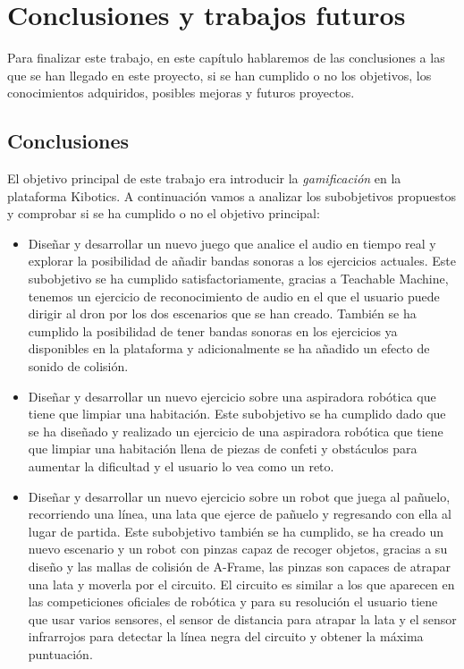 \chapter{Conclusiones y trabajos futuros}\label{conclusion}
Para finalizar este trabajo, en este capítulo hablaremos de las conclusiones a las que se han llegado en este proyecto, si se han cumplido o no los objetivos,  los conocimientos adquiridos, posibles mejoras y futuros proyectos.

\section{Conclusiones}

El objetivo principal de este trabajo era introducir la \textit{gamificación} en la plataforma Kibotics. A continuación vamos a analizar los subobjetivos propuestos y comprobar si se ha cumplido o no el objetivo principal:

\begin{itemize}
    \item Diseñar y desarrollar un nuevo juego que analice el audio en tiempo real y explorar la posibilidad de añadir bandas sonoras a los ejercicios actuales.  Este subobjetivo se ha cumplido satisfactoriamente, gracias a Teachable Machine, tenemos un ejercicio de reconocimiento de audio en el que el usuario puede dirigir al dron por los dos escenarios que se han creado. También se ha cumplido la posibilidad de tener bandas sonoras en los ejercicios ya disponibles en la plataforma y adicionalmente se ha añadido un efecto de sonido de colisión. 

    \item Diseñar y desarrollar un nuevo ejercicio sobre una aspiradora robótica que tiene que limpiar una habitación.  Este subobjetivo se ha cumplido dado que se ha  diseñado y realizado un ejercicio de una aspiradora robótica que tiene que limpiar una habitación llena de piezas de confeti y obstáculos para aumentar la dificultad y el usuario lo vea como un reto.

    \item Diseñar y desarrollar un nuevo ejercicio sobre un robot que juega al pañuelo, recorriendo una línea, una lata que ejerce de pañuelo y regresando con ella al lugar de partida. Este subobjetivo también se ha cumplido, se ha creado un nuevo escenario y un robot con pinzas capaz de recoger objetos, gracias a su diseño y las mallas de colisión de A-Frame, las pinzas son capaces de atrapar una lata y moverla por el circuito. El circuito es similar a los que aparecen en las competiciones oficiales de robótica y para su resolución el usuario tiene que usar varios sensores, el sensor de distancia para atrapar la lata y el sensor infrarrojos para detectar la línea negra del circuito y obtener la máxima puntuación. 
\end{itemize}

